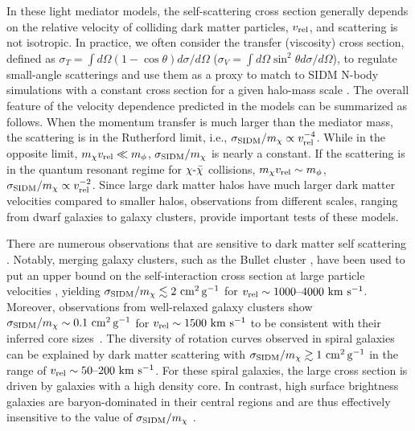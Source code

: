 In these light mediator models, the self-scattering cross section generally depends on the relative velocity of colliding dark matter particles, $v_{\rm rel}$, and scattering is not isotropic. In practice, we often consider the transfer (viscosity) cross section, defined as $\sigma_T = \int d\Omega(1-\cos\theta)d\sigma/d\Omega$ ($\sigma_V = \int d\Omega\sin^2\theta d\sigma/d\Omega$), to regulate small-angle scatterings and use them as a proxy to match to SIDM N-body simulations with a constant cross section for a given halo-mass scale \citep[][]{Tulin:2013teo,Kahlhoefer:2013dca}. The overall feature of the velocity dependence predicted in the models can be summarized as follows. When the momentum transfer is much larger than the mediator mass, the scattering is in the Rutherford limit, i.e., $\sigma_{\rm SIDM}/m_\chi \propto v^{-4}_{\rm rel}$. While in the opposite limit, $m_\chi v_{\rm rel}\ll m_\phi$, $\sigma_{\rm SIDM}/m_\chi$ is nearly a constant. If the scattering is in the quantum resonant regime for $\chi\textup{-}\bar{\chi}$ collisions, $m_\chi v_{\rm rel}\sim m_\phi$, $\sigma_{\rm SIDM}/m_\chi \propto v^{-2}_{\rm rel}$. Since large dark matter halos have much larger dark matter velocities compared to smaller halos, observations from different scales, ranging from dwarf galaxies to galaxy clusters, provide important tests of these models.


There are numerous observations that are sensitive to dark matter self scattering \citep[\eg,  Table 1 in][]{Tulin:2017ara}. Notably, merging galaxy clusters, such as the Bullet cluster  \citep{Randall:2007ph,2017MNRAS.465..569R}, have been used to put an upper bound on the self-interaction cross section at large particle velocities \citep[\eg,][]{Kahlhoefer:2013dca,Kahlhoefer:2015vua,Kim:2016ujt,Harvey:2016bqd,Robertson:2016qef,Wittman:2017gxn}, yielding $\sigma_{\rm SIDM}/m_\chi \lesssim 2 \mathrm{\,\mathrm{\,cm}^2\mathrm{\,g}^{-1}}$ for $v_{\rm rel} \sim 1000\textup{--}4000 \mathrm{\,\mathrm{\,km}\,\mathrm{\,s}^{-1}}$. Moreover, observations from well-relaxed galaxy clusters \citep{Newman++11,Newman:2013,Newman++13b} show $\sigma_{\rm SIDM}/m_\chi \sim 0.1 \mathrm{\,\mathrm{\,cm}^2\mathrm{\,g}^{-1}}$ for $v_{\rm rel} \sim 1500 \mathrm{\,\mathrm{\,km}\,\mathrm{\,s}^{-1}}$ to be consistent with their inferred core sizes~\citep{Kaplinghat:2015aga,Andrade:2019wzn}. The diversity of rotation curves observed in spiral galaxies can be explained by dark matter scattering with $\sigma_{\rm SIDM}/m_\chi \gtrsim 1 \mathrm{\,\mathrm{\,cm}^2\mathrm{\,g}^{-1}}$ in the range of $v_{\rm rel}\sim50\textup{--}200 \mathrm{\,\mathrm{\,km}\,\mathrm{\,s}^{-1}}$. For these spiral galaxies, the large cross section is driven by galaxies with a high density core. In contrast, high surface brightness galaxies are baryon-dominated in their central regions and are thus effectively insensitive to the value of $\sigma_{\rm SIDM}/m_\chi$ \citep{Kamada:2016euw,Ren:2018jpt}. 

